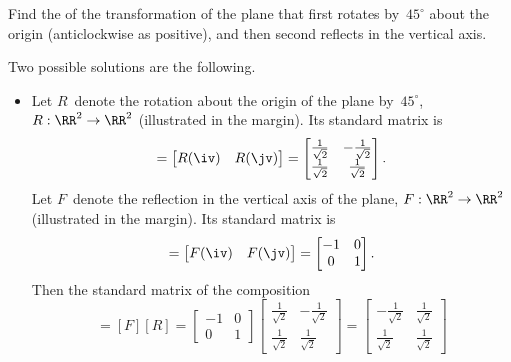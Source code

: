 \begin{example} 
Find the  of the transformation of the plane that first rotates by~\(45^\circ\) about the origin (anticlockwise as positive), and then second reflects in the vertical axis.
\begin{solution} 
Two possible solutions are the following.
\begin{itemize}
\item Let \(R\)~denote the rotation about the origin of the plane by~\(45^\circ\), \(R:\RR^2\to\RR^2\) (illustrated in the margin).
%
Its standard matrix is
\newcommand{\rt}{\frac1{\sqrt2}}
\begin{equation*}
[R]=\begin{bmatrix} R(\iv)&R(\jv) \end{bmatrix}
=\begin{bmatrix} \rt&-\rt\\\rt&\rt \end{bmatrix}.
\end{equation*}
Let \(F\)~denote the reflection in the vertical axis of the plane, \(F:\RR^2\to\RR^2\) (illustrated in the margin). 
%
Its standard matrix is
\begin{equation*}
[F]=\begin{bmatrix} F(\iv)&F(\jv) \end{bmatrix}
=\begin{bmatrix} -1&0\\0&1 \end{bmatrix}.
\end{equation*}
Then the standard matrix of the composition 
\begin{equation*}
[F\circ R]=[F][R]
=\begin{bmatrix} -1&0\\0&1 \end{bmatrix}
\begin{bmatrix} \rt&-\rt\\\rt&\rt \end{bmatrix}
=\begin{bmatrix} -\rt&\rt\\\rt&\rt \end{bmatrix}
\end{equation*}


\end{itemize}
\end{solution}
\end{example}
